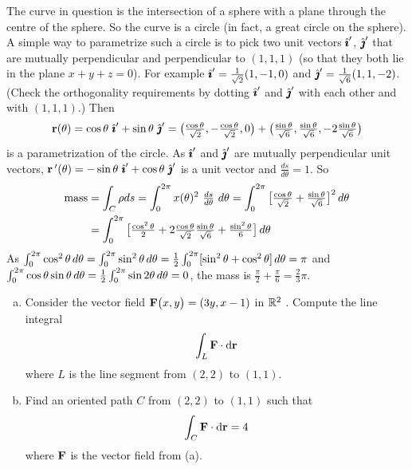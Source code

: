 \begin{solution} 
The curve in question is the intersection of a sphere with
a plane through the centre of the sphere. So the curve is a circle (in
fact, a great circle on the sphere). A simple way to parametrize such a
circle is to pick two unit vectors $\hat{\pmb{\imath}}'$, $\hat{\pmb{\jmath}}'$ that are mutually
perpendicular and perpendicular to $(1,1,1)$ (so that they both lie in
the plane $x+y+z=0$). For example $\hat{\pmb{\imath}}' = \tfrac{1}{\sqrt{2}}(1,-1,0)$
and $\hat{\pmb{\jmath}}'=\tfrac{1}{\sqrt{6}}(1,1,-2)$. (Check the orthogonality requirements
by dotting $\hat{\pmb{\imath}}'$ and $\hat{\pmb{\jmath}}'$ with each other and with $(1,1,1)$.) Then
\begin{equation*}
\vr(\theta)=\cos\theta\ \hi'+\sin\theta\ \hj'
=\big(\tfrac{\cos\theta}{\sqrt{2}},-\tfrac{\cos\theta}{\sqrt{2}}, 0\big)
+\big(\tfrac{\sin\theta}{\sqrt{6}},\tfrac{\sin\theta}{\sqrt{6}}, -2\tfrac{\sin\theta}{\sqrt{6}}\big)
\end{equation*}
is a parametrization of the circle. As $\hat{\pmb{\imath}}'$ and $\hat{\pmb{\jmath}}'$ are mutually
perpendicular unit vectors, ${\vr\,}'(\theta)=-\sin\theta\ \hi'+\cos\theta\ \hj'$
is a unit vector and $\tfrac{ds}{d\theta}=1$. So
\begin{align*}
{\rm mass}&=\int_C\rho ds
=\int_0^{2\pi} x(\theta)^2\ \tfrac{ds}{d\theta}\ d\theta
=\int_0^{2\pi}\big[\tfrac{\cos\theta}{\sqrt{2}}
+\tfrac{\sin\theta}{\sqrt{6}}\big]^2\,d\theta \\
&=\int_0^{2\pi}\big[\tfrac{\cos^2\theta}{2}
+2\tfrac{\cos\theta}{\sqrt{2}}
\tfrac{\sin\theta}{\sqrt{6}}
+\tfrac{\sin^2\theta}{6}\big]\,d\theta
\end{align*}
As $\int_0^{2\pi}\cos^2\theta\,d\theta=\int_0^{2\pi}\sin^2\theta\,d\theta
=\tfrac{1}{2} \int_0^{2\pi}[\sin^2\theta+\cos^2\theta]\,d\theta=\pi$
and $\int_0^{2\pi}\cos\theta\sin\theta\,d\theta=\tfrac{1}{2}\int_0^{2\pi}\sin 2\theta\,d\theta=0$,
the mass is $\tfrac{\pi}{2}+\tfrac{\pi}{6}=\tfrac{2}{3}\pi$.
\end{solution}




\begin{question}[M317 2012D]\label{path1} %
	
	\begin{enumerate}[(a)]
		\item
		Consider the vector field $\mathbf{F}\big(x,y\big)= (3y, x-1)$ in $\mathbb{R}^2$ . Compute 
		the line integral
		\begin{equation*}
		\int_L \mathbf{F}\cdot\mathrm{d}\mathbf{r} 
		\end{equation*}
		where $L$ is the line segment from $(2, 2)$ to $(1, 1)$.
		\item
		Find an oriented path $C$ from $(2, 2)$ to $(1, 1)$ such that
		\begin{equation*}
		\int_C \mathbf{F}\cdot\mathrm{d}\mathbf{r} =4
		\end{equation*}
		where $\mathbf{F}$ is the vector field from (a).
	\end{enumerate}
\end{question}

